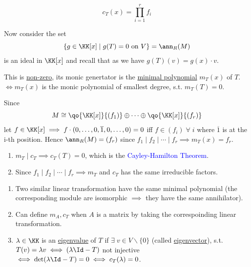 \begin{conclusion}
	\leavevmode
	\[
		c_T(x) = \prod_{i=1}^r f_i
	\]
\end{conclusion}
Now consider the set
\[
	\{g \in \KK[x] \; | \; g(T) = 0 \text{ on } V\} = \ann_R(M)
\]
is an ideal in \( \KK[x] \) and recall that as we have \( g(T)(v) = g(x) \cdot v \).

\begin{claim}
	This is \underline{non-zero}, its monic genertator is the \underline{minimal polynomial} \( m_T(x) \)
	of \( T \). \( \iff m_T(x)\)  is the monic polynomial of smallest degree, s.t. \( m_T(T) = 0 \).
\end{claim}
Since
\[
	M \cong \qo{\KK[x]}{(f_1)} \oplus \cdots \oplus \qo{\KK[x]}{(f_r)}
\]
let \( f\in \KK[x] \implies f\cdot (0,\ldots, 0,\overline{1}, 0,\ldots, 0) = 0 \) iff \( f\in (f_i) \; \forall \; i \)
where \( \overline{1} \) is at the i-th position. Hence \( \ann_R(M) = (f_r) \) since \( f_1\mid
f_2\mid \cdots \mid f_r \implies m_T(x) = f_r \).

\begin{conclusion}
	\leavevmode
	\begin{enumerate}
		\item \( m_T \mid c_T \implies c_T(T) = 0 \), which is the \textcolor{blue}{Cayley-Hamilton
			      Theorem}.
		\item Since \( f_1\mid f_2 \mid \cdots \mid f_r \implies m_T \) and \( c_T \) has the same
		      irreducible factors.
	\end{enumerate}
\end{conclusion}

\begin{note}
	\leavevmode
	\begin{enumerate}
		\item Two similar linear transformation have the same minimal polynomial (the corresponding
		      module are isomorphic \( \implies \) they have the same annihilator).
		\item Can define \( m_A, c_T \) when \( A \) is a matrix by taking the correspoinding linear
		      transformation.
		\item \( \lambda \in \KK \) is an \underline{eigenvalue} of \( T \) if \( \exists \; v \in V
		      \smallsetminus \{0\}\) (called \underline{eigenvector}), s.t. \( T(v) = \lambda v \iff
		      (\lambda \Id - T) \) not injective \( \iff \det(\lambda \Id - T) = 0 \iff c_T(\lambda) = 0\).
	\end{enumerate}
\end{note}

